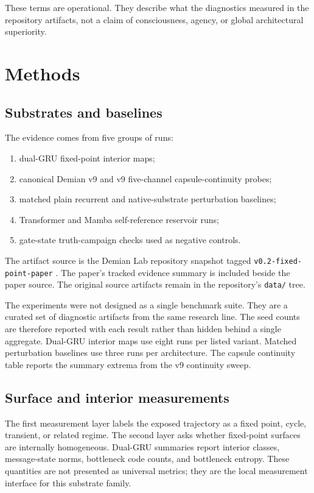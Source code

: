\documentclass[11pt]{article}
\begin{document}
These terms are operational. They describe what the diagnostics measured in
the repository artifacts, not a claim of consciousness, agency, or global
architectural superiority.

\section{Methods}

\subsection{Substrates and baselines}

The evidence comes from five groups of runs:

\begin{enumerate}
  \item dual-GRU fixed-point interior maps;
  \item canonical Demian v9 and v9 five-channel capsule-continuity probes;
  \item matched plain recurrent and native-substrate perturbation baselines;
  \item Transformer and Mamba self-reference reservoir runs;
  \item gate-state truth-campaign checks used as negative controls.
\end{enumerate}

The artifact source is the Demian Lab repository snapshot tagged
\texttt{v0.2-fixed-point-paper} \citep{demianlab2026}. The paper's tracked
evidence summary is included beside the paper source. The original source
artifacts remain in the repository's \texttt{data/} tree.

The experiments were not designed as a single benchmark suite. They are a
curated set of diagnostic artifacts from the same research line. The seed
counts are therefore reported with each result rather than hidden behind a
single aggregate. Dual-GRU interior maps use eight runs per listed variant.
Matched perturbation baselines use three runs per architecture. The capsule
continuity table reports the summary extrema from the v9 continuity sweep.

\subsection{Surface and interior measurements}

The first measurement layer labels the exposed trajectory as a fixed point,
cycle, transient, or related regime. The second layer asks whether fixed-point
surfaces are internally homogeneous. Dual-GRU summaries report interior
classes, message-state norms, bottleneck code counts, and bottleneck entropy.
These quantities are not presented as universal metrics; they are the local
measurement interface for this substrate family.
\end{document}
